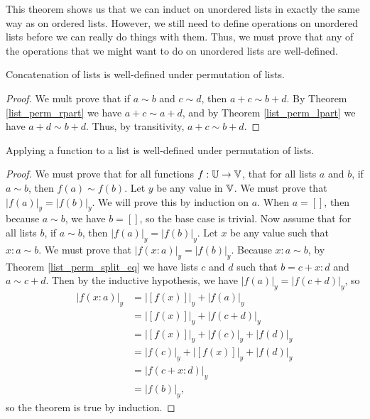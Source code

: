 \documentclass[../math.tex]{subfiles}
\begin{document}
This theorem shows us that we can induct on unordered lists in exactly the same
way as on ordered lists.  However, we still need to define operations on
unordered lists before we can really do things with them.  Thus, we must prove
that any of the operations that we might want to do on unordered lists are
well-defined.

\begin{lemma}
    Concatenation of lists is well-defined under permutation of lists.
\end{lemma}
\begin{proof}
    We mult prove that if $a \sim b$ and $c \sim d$, then $a + c \sim b + d$.
    By Theorem \ref{list_perm_rpart} we have $a + c \sim a + d$, and by Theorem
    \ref{list_perm_lpart} we have $a + d \sim b + d$.  Thus, by transitivity, $a
    + c \sim b + d$.
\end{proof}

\begin{lemma}
    Applying a function to a list is well-defined under permutation of lists.
\end{lemma}
\begin{proof}
    We must prove that for all functions $f : \mathbb{U} \to \mathbb{V}$, that for all lists $a$
    and $b$, if $a \sim b$, then $f(a) \sim f(b)$.  Let $y$ be any value in
    $\mathbb{V}$.  We must prove that $|f(a)|_y = |f(b)|_y$.  We will prove this by
    induction on $a$.  When $a = []$, then because $a \sim b$, we have $b = []$,
    so the base case is trivial.  Now assume that for all lists $b$, if $a \sim
    b$, then $|f(a)|_y = |f(b)|_y$.  Let $x$ be any value such that $x : a \sim
    b$.  We must prove that $|f(x : a)|_y = |f(b)|_y$.  Because $x : a \sim b$,
    by Theorem \ref{list_perm_split_eq} we have lists $c$ and $d$ such that $b =
    c + x : d$ and $a \sim c + d$.  Then by the inductive hypothesis, we have
    $|f(a)|_y = |f(c + d)|_y$, so
    \begin{align*}
        |f(x : a)|_y
        &= |[f(x)]|_y + |f(a)|_y \\
        &= |[f(x)]|_y + |f(c + d)|_y \\
        &= |[f(x)]|_y + |f(c)|_y + |f(d)|_y \\
        &= |f(c)|_y + |[f(x)]|_y + |f(d)|_y \\
        &= |f(c + x : d)|_y \\
        &= |f(b)|_y,
    \end{align*}
    so the theorem is true by induction.
\end{proof}
\end{document}
